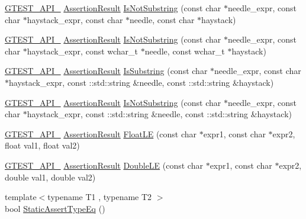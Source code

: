 \begin{DoxyCompactItemize}
\item 
\hyperlink{gtest-port_8h_aa73be6f0ba4a7456180a94904ce17790}{G\+T\+E\+S\+T\+\_\+\+A\+P\+I\+\_\+} \hyperlink{classtesting_1_1AssertionResult}{Assertion\+Result} \hyperlink{namespacetesting_a2288dcf4249f88af67dcd46544dc49a6}{Is\+Not\+Substring} (const char $\ast$needle\+\_\+expr, const char $\ast$haystack\+\_\+expr, const char $\ast$needle, const char $\ast$haystack)
\item 
\hyperlink{gtest-port_8h_aa73be6f0ba4a7456180a94904ce17790}{G\+T\+E\+S\+T\+\_\+\+A\+P\+I\+\_\+} \hyperlink{classtesting_1_1AssertionResult}{Assertion\+Result} \hyperlink{namespacetesting_a53e5c6e91ea429c43de7f4f57e33d166}{Is\+Not\+Substring} (const char $\ast$needle\+\_\+expr, const char $\ast$haystack\+\_\+expr, const wchar\+\_\+t $\ast$needle, const wchar\+\_\+t $\ast$haystack)
\item 
\hyperlink{gtest-port_8h_aa73be6f0ba4a7456180a94904ce17790}{G\+T\+E\+S\+T\+\_\+\+A\+P\+I\+\_\+} \hyperlink{classtesting_1_1AssertionResult}{Assertion\+Result} \hyperlink{namespacetesting_a571c7edcfc574269833ebe3e7d338ec5}{Is\+Substring} (const char $\ast$needle\+\_\+expr, const char $\ast$haystack\+\_\+expr, const \+::std\+::string \&needle, const \+::std\+::string \&haystack)
\item 
\hyperlink{gtest-port_8h_aa73be6f0ba4a7456180a94904ce17790}{G\+T\+E\+S\+T\+\_\+\+A\+P\+I\+\_\+} \hyperlink{classtesting_1_1AssertionResult}{Assertion\+Result} \hyperlink{namespacetesting_abe7b3fa1c9528745f934d4a14155ea87}{Is\+Not\+Substring} (const char $\ast$needle\+\_\+expr, const char $\ast$haystack\+\_\+expr, const \+::std\+::string \&needle, const \+::std\+::string \&haystack)
\item 
\hyperlink{gtest-port_8h_aa73be6f0ba4a7456180a94904ce17790}{G\+T\+E\+S\+T\+\_\+\+A\+P\+I\+\_\+} \hyperlink{classtesting_1_1AssertionResult}{Assertion\+Result} \hyperlink{namespacetesting_a2c9a2a391c72a7b02ea3024586e33af0}{Float\+LE} (const char $\ast$expr1, const char $\ast$expr2, float val1, float val2)
\item 
\hyperlink{gtest-port_8h_aa73be6f0ba4a7456180a94904ce17790}{G\+T\+E\+S\+T\+\_\+\+A\+P\+I\+\_\+} \hyperlink{classtesting_1_1AssertionResult}{Assertion\+Result} \hyperlink{namespacetesting_ae10e2bb304b74abd1b06a2d912a8b43b}{Double\+LE} (const char $\ast$expr1, const char $\ast$expr2, double val1, double val2)
\item 
{\footnotesize template$<$typename T1 , typename T2 $>$ }\\bool \hyperlink{namespacetesting_a661e70fc6afeb5c085eed3716aa45059}{Static\+Assert\+Type\+Eq} ()

\end{DoxyCompactItemize}

